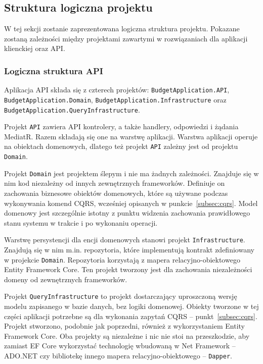 \subsection{Struktura logiczna projektu}
\label{sec:struktura-logiczna-projektu}

W tej sekcji zostanie zaprezentowana logiczna struktura projektu. 
Pokazane zostaną zależności między projektami zawartymi w rozwiązaniach dla aplikacji klienckiej oraz API.

\subsubsection{Logiczna struktura API}

Aplikacja API składa się z czterech projektów: \texttt{BudgetApplication.API}, \texttt{BudgetApplication.Domain}, \texttt{BudgetApplication.Infrastructure} oraz \texttt{BudgetApplication.QueryInfrastructure}.

Projekt \texttt{API} zawiera API kontrolery, a także handlery, odpowiedzi i żądania MediatR. Razem składają się one na warstwę aplikacji. Warstwa aplikacji operuje na obiektach domenowych, dlatego też projekt \texttt{API} zależny jest od projektu \texttt{Domain}.

Projekt \texttt{Domain} jest projektem ślepym i nie ma żadnych zależności. Znajduje się w nim kod niezależny od innych zewnętrznych frameworków. Definiuje on zachowania biznesowe obiektów domenowych, które są używane podczas wykonywania komend CQRS, wcześniej opisanych w punkcie~\ref{subsec:cqrs}. Model domenowy jest szczególnie istotny z punktu widzenia zachowania prawidłowego stanu systemu w trakcie i po wykonaniu operacji.

Warstwę persystencji dla encji domenowych stanowi projekt \texttt{Infrastructure}. Znajdują się w nim m.in. repozytoria, które implementują kontrakt zdefiniowany w projekcie \texttt{Domain}. Repozytoria korzystają z mapera relacyjno-obiektowego Entity Framework Core. Ten projekt tworzony jest dla zachowania niezależności domeny od zewnętrznych frameworków.

Projekt \texttt{QueryInfrastructure} to projekt dostarczający uproszczoną wersję modelu zapisanego w bazie danych, bez logiki domenowej. Obiekty tworzone w tej części aplikacji potrzebne są dla wykonania zapytań CQRS -- punkt~\ref{subsec:cqrs}. Projekt stworzono, podobnie jak poprzedni, również z wykorzystaniem Entity Framework Core. Oba projekty są niezależne i nic nie stoi na przeszkodzie, aby zamiast EF Core wykorzystać technologię wbudowaną w Net Framework -- ADO.NET czy bibliotekę innego mapera relacyjno-obiektowego -- \texttt{Dapper}.

